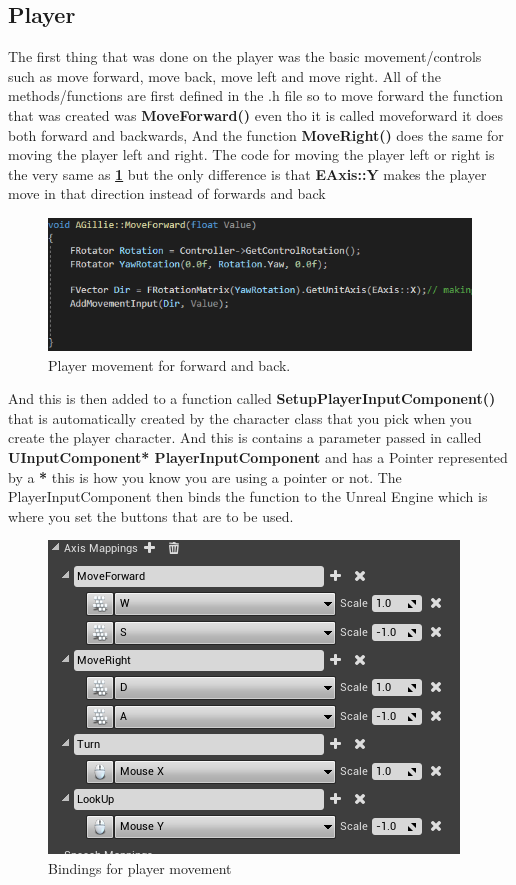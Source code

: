 \subsection{Player}
The first thing that was done on the player was the basic movement/controls such as move forward, move back, move left and move right. All of the methods/functions are first defined in the .h file so to move forward the function that was created was \textbf{MoveForward()} even tho it is called moveforward it does both forward and backwards, And the function \textbf{MoveRight()} does the same for moving the player left and right. The code for moving the player left or right is the very same as \textbf{\ref{Movement}} but the only difference is that \textbf{EAxis::Y} makes the player move in that direction instead of forwards and back
\begin{figure}[H]
    \centering
    \includegraphics[scale=.9]{img/MoveCode.PNG}
    \caption{Player movement for forward and back.}
    \label{Movement}
\end{figure}
And this is then added to a function called \textbf{SetupPlayerInputComponent()} that is automatically created by the character class that you pick when you create the player character. And this is contains a parameter passed in called \textbf{UInputComponent* PlayerInputComponent} and has a Pointer represented by a \textbf{*} this is how you know you are using a pointer or not. The PlayerInputComponent then binds the function to the Unreal Engine which is where you set the buttons that are to be used.

\begin{figure}[H]
    \centering
    \includegraphics[scale=.5]{img/MovementInputs.PNG}
    \caption{Bindings for player movement}
    \label{Binding}
\end{figure}

